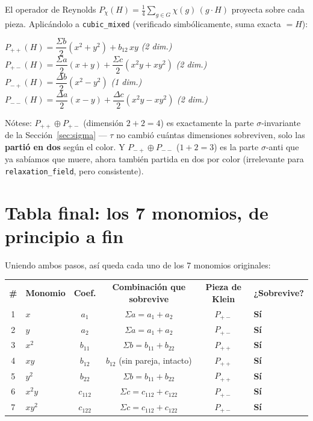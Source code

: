 \documentclass[11pt, a4paper]{article}
\newcommand{\TH}[1]{\cellcolor{cTHbg}\color{white}\textbf{#1}}
\newcommand{\good}[1]{\color{cGood}\textbf{#1}}
\begin{document}
El operador de Reynolds $P_\chi(H)=\frac{1}{4}\sum_{g\in G}\chi(g)\,(g{\cdot}H)$
proyecta sobre cada pieza. Aplic\'andolo a \texttt{cubic\_mixed}
(verificado simb\'olicamente, suma exacta $=H$):

\begin{tcolorbox}[codebox]
$P_{++}(H) = \dfrac{\Sigma b}{2}(x^2{+}y^2) + b_{12}\,xy$
\hfill \textit{(2 dim.)} \\[4pt]
$P_{+-}(H) = \dfrac{\Sigma a}{2}(x{+}y) + \dfrac{\Sigma c}{2}(x^2y{+}xy^2)$
\hfill \textit{(2 dim.)} \\[4pt]
$P_{-+}(H) = \dfrac{\Delta b}{2}(x^2{-}y^2)$
\hfill \textit{(1 dim.)} \\[4pt]
$P_{--}(H) = \dfrac{\Delta a}{2}(x{-}y) + \dfrac{\Delta c}{2}(x^2y{-}xy^2)$
\hfill \textit{(2 dim.)}
\end{tcolorbox}

N\'otese: $P_{++}\oplus P_{+-}$ (dimensi\'on $2+2=4$) es exactamente la
parte $\sigma$-invariante de la Secci\'on~\ref{sec:sigma} --- $\tau$ no
cambi\'o cu\'antas dimensiones sobreviven, solo las \textbf{parti\'o en
dos} seg\'un el color. Y $P_{-+}\oplus P_{--}$ ($1+2=3$) es la parte
$\sigma$-anti que ya sab\'iamos que muere, ahora tambi\'en partida en
dos por color (irrelevante para \texttt{relaxation\_field}, pero
consistente).

\section{Tabla final: los 7 monomios, de principio a fin}

Uniendo ambos pasos, as\'i queda cada uno de los 7 monomios
originales:

\medskip
\begin{center}
\begin{tabular}{clcccl}
  \TH{\#} & \TH{Monomio} & \TH{Coef.} & \TH{Combinaci\'on que sobrevive} & \TH{Pieza de Klein} & \TH{¿Sobrevive?} \\[1pt]
  1 & $x$    & $a_1$     & $\Sigma a = a_1{+}a_2$         & $P_{+-}$ & \good{S\'i} \\
  2 & $y$    & $a_2$     & $\Sigma a = a_1{+}a_2$         & $P_{+-}$ & \good{S\'i} \\
  3 & $x^2$  & $b_{11}$  & $\Sigma b = b_{11}{+}b_{22}$   & $P_{++}$ & \good{S\'i} \\
  4 & $xy$   & $b_{12}$  & $b_{12}$ (sin pareja, intacto) & $P_{++}$ & \good{S\'i} \\
  5 & $y^2$  & $b_{22}$  & $\Sigma b = b_{11}{+}b_{22}$   & $P_{++}$ & \good{S\'i} \\
  6 & $x^2y$ & $c_{112}$ & $\Sigma c = c_{112}{+}c_{122}$ & $P_{+-}$ & \good{S\'i} \\
  7 & $xy^2$ & $c_{122}$ & $\Sigma c = c_{112}{+}c_{122}$ & $P_{+-}$ & \good{S\'i} \\
\end{tabular}
\end{center}
\medskip
\end{document}
